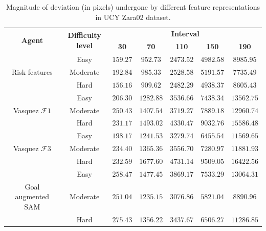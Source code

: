 \begin{table}[htbp]
	\begin{center}
		\renewcommand{\arraystretch}{1.3}
		\begin{tabular}{|c|c|c|c|c|c|c|}
			\hline
			\multicolumn{1}{|c|}{\multirow{2}{*}{\textbf{Agent}}} & \multicolumn{1}{c|}{\multirow{2}{*}{\textbf{Difficulty level}}}  & \multicolumn{5}{c|}{\multirow{1}{*}{\textbf{Interval}}}\\ \cline{3-7}
			
			&& \textbf{30} & \textbf{70} & \textbf{110} & \textbf{150}  &  \textbf{190} \\
			\hline
		    & Easy & $159.27$ & $952.73 $ & $2473.52$ & $4982.58$ & $8985.95 $ \\ \cline{2-7}
			Risk features 	& Moderate & $192.84$ & $985.33 $ & $2528.58$ & $5191.57$ & $7735.49 $ \\ \cline{2-7}
			& Hard & $156.16$ & $909.62 $ & $2482.29$ & $4938.37$ & $8605.43 $ \\
			\hline
			& Easy & $206.30$ & $1282.88$ & $3536.66$ & $7438.34 $ & $13562.75$ \\ \cline{2-7}
			Vasquez $\mathcal{F}1$  & Moderate & $250.43$ & $1407.54$ & $3719.27$ & $7889.18$ & $12960.74$ \\ \cline{2-7}
			& Hard & $231.17$ & $1493.02$ & $4330.47$ & $9032.76$ & $15586.48$ \\
			\hline
			& Easy & $198.17$ & $1241.53$ & $3279.74$ & $6455.54$ & $11569.65$ \\ \cline{2-7}
	    	Vasquez $\mathcal{F}3$ 	& Moderate & $234.40$ & $1365.36$ & $3556.70$ & $7280.97$ & $11881.93$ \\ \cline{2-7}
			& Hard & $232.59$ & $1677.60$ & $4731.14$ & $9509.05$ & $16422.56$ \\
			\hline			
			& Easy & $258.47$ & $1477.45$ & $3869.17$ & $7533.29$ & $13064.31$ \\ \cline{2-7}
			Goal augmented SAM  & Moderate & $251.04$ & $1235.15$ & $3076.86$ & $5821.04$ & $8890.96 $ \\ \cline{2-7}
			& Hard & $275.43$ & $1356.22$ & $3437.67$ & $6506.27$ & $11286.85$ \\
			\hline
		\end{tabular}
	\end{center}
	\caption{Magnitude of deviation (in pixels) undergone by different feature representations in UCY Zara02 dataset.}
	\label{tab:zara02_inter_irl_drift_results}
\end{table}

